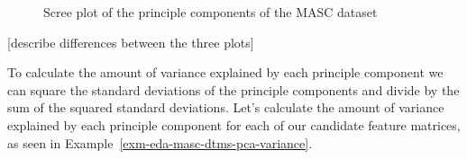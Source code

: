 \documentclass[
  letterpaper,
  DIV=11,
  numbers=noendperiod]{scrreport}
\theoremstyle{definition}
\theoremstyle{remark}
\begin{document}
\begin{figure}

\begin{minipage}[t]{0.33\linewidth}

{\centering 


}

\end{minipage}%
%
\begin{minipage}[t]{0.33\linewidth}

{\centering 


}

\end{minipage}%
%
\begin{minipage}[t]{0.33\linewidth}

{\centering 


}

\end{minipage}%

\caption{\label{fig-eda-masc-dtms-pca-scree}Scree plot of the principle
components of the MASC dataset}

\end{figure}

{[}describe differences between the three plots{]}

To calculate the amount of variance explained by each principle
component we can square the standard deviations of the principle
components and divide by the sum of the squared standard deviations.
Let's calculate the amount of variance explained by each principle
component for each of our candidate feature matrices, as seen in
Example~\ref{exm-eda-masc-dtms-pca-variance}.
\end{document}

